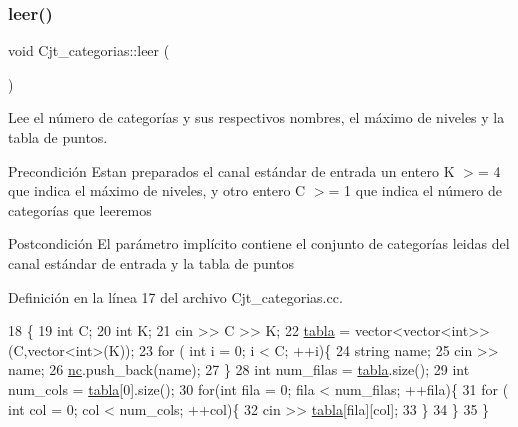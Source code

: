 \subsubsection{\texorpdfstring{leer()}{leer()}}
{\footnotesize\ttfamily void Cjt\+\_\+categorias\+::leer (\begin{DoxyParamCaption}{ }\end{DoxyParamCaption})}



Lee el número de categorías y sus respectivos nombres, el máximo de niveles y la tabla de puntos. 

\begin{DoxyPrecond}{Precondición}
Estan preparados el canal estándar de entrada un entero K $>$= 4 que indica el máximo de niveles, y otro entero C $>$= 1 que indica el número de categorías que leeremos 
\end{DoxyPrecond}
\begin{DoxyPostcond}{Postcondición}
El parámetro implícito contiene el conjunto de categorías leidas del canal estándar de entrada y la tabla de puntos 
\end{DoxyPostcond}


Definición en la línea 17 del archivo Cjt\+\_\+categorias.\+cc.


\begin{DoxyCode}
18 \{
19     \textcolor{keywordtype}{int} C;
20     \textcolor{keywordtype}{int} K;
21     cin >> C >> K;
22     \hyperlink{class_cjt__categorias_af03722d79d2b1ec784954dd13a7168eb}{tabla} = vector<vector<int>>(C,vector<int>(K));
23     \textcolor{keywordflow}{for} ( \textcolor{keywordtype}{int} i = 0; i < C; ++i)\{
24         \textcolor{keywordtype}{string} name;
25         cin >> name;
26         \hyperlink{class_cjt__categorias_aad3febb4a17038ba65b2f79a4a509289}{nc}.push\_back(name);
27     \}
28     \textcolor{keywordtype}{int} num\_filas = \hyperlink{class_cjt__categorias_af03722d79d2b1ec784954dd13a7168eb}{tabla}.size();
29     \textcolor{keywordtype}{int} num\_cols = \hyperlink{class_cjt__categorias_af03722d79d2b1ec784954dd13a7168eb}{tabla}[0].size();
30     \textcolor{keywordflow}{for}(\textcolor{keywordtype}{int} fila = 0; fila < num\_filas; ++fila)\{
31         \textcolor{keywordflow}{for} ( \textcolor{keywordtype}{int} col = 0; col < num\_cols; ++col)\{
32             cin >> \hyperlink{class_cjt__categorias_af03722d79d2b1ec784954dd13a7168eb}{tabla}[fila][col];
33         \}
34     \}
35 \}
\end{DoxyCode}
\mbox{\label{class_cjt__categorias_acd18a2fe2b4336dd5faa7e418962d713}} 
